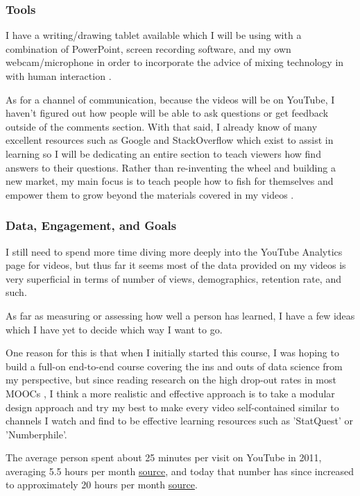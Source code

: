 \documentclass[
	letterpaper, %
]{jdf}
\begin{document}
\subsubsection{Tools}

I have a writing/drawing tablet available which I will be using with a combination of PowerPoint, screen recording software, and my own webcam/microphone in order to incorporate the advice of mixing technology in with human interaction \citep{guo11}. 

As for a channel of communication, because the videos will be on YouTube, I haven't figured out how people will be able to ask questions or get feedback outside of the comments section. With that said, I already know of many excellent resources such as Google and StackOverflow which exist to assist in learning so I will be dedicating an entire section to teach viewers how find answers to their questions. Rather than re-inventing the wheel and building a new market, my main focus is to teach people how to fish for themselves and empower them to grow beyond the materials covered in my videos \citep{zhao2005makes}.

\subsubsection{Data, Engagement, and Goals}

I still need to spend more time diving more deeply into the YouTube Analytics page for videos, but thus far it seems most of the data provided on my videos is very superficial in terms of number of views, demographics, retention rate, and such.

As far as measuring or assessing how well a person has learned, I have a few ideas which I have yet to decide which way I want to go.

One reason for this is that when I initially started this course, I was hoping to build a full-on end-to-end course covering the ins and outs of data science from my perspective, but since reading research on the high drop-out rates in most MOOCs \citep{maartje9}, I think a more realistic and effective approach is to take a modular design approach and try my best to make every video self-contained similar to channels I watch and find to be effective learning resources such as 'StatQuest' or 'Numberphile'.

The average person spent about 25 minutes per visit on YouTube in 2011, averaging 5.5 hours per month \href{https://royal.pingdom.com/facebook-youtube-our-collective-time-sinks-stats/}{source}, and today that number has since increased to approximately 20 hours per month \href{https://www.quora.com/What-is-the-average-time-spent-by-an-person-on-YouTube-in-a-day}{source}. 
\end{document}
